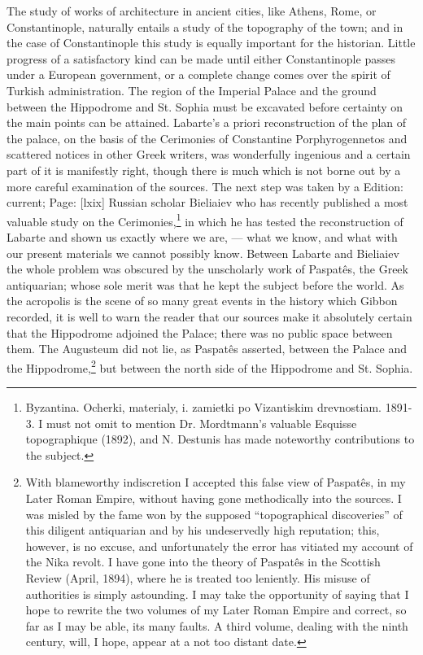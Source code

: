 The study of works of architecture in ancient cities, like Athens, Rome, or Constantinople, naturally entails a study of the topography of the town; and in the case of Constantinople this study is equally important for the historian. Little progress of a satisfactory kind can be made until either Constantinople passes under a European government, or a complete change comes over the spirit of Turkish administration. The region of the Imperial Palace and the ground between the Hippodrome and St. Sophia must be excavated before certainty on the main points can be attained. Labarte\texthebrew{}’s a priori reconstruction of the plan of the palace, on the basis of the Cerimonies of Constantine Porphyrogennetos and scattered notices in other Greek writers, was wonderfully ingenious and a certain part of it is manifestly right, though there is much which is not borne out by a more careful examination of the sources. The next step was taken by a Edition: current; Page: [lxix] Russian scholar Bieliaiev who has recently published a most valuable study on the Cerimonies,\footnote{Byzantina. Ocherki, materialy, i. zamietki po Vizantiskim drevnostiam. 1891-3. I must not omit to mention Dr. Mordtmann\texthebrew{}’s valuable Esquisse topographique (1892), and N. Destunis has made noteworthy contributions to the subject.} in which he has tested the reconstruction of Labarte and shown us exactly where we are, \texthebrew{—} what we know, and what with our present materials we cannot possibly know. Between Labarte and Bieliaiev the whole problem was obscured by the unscholarly work of Paspatês, the Greek antiquarian; whose sole merit was that he kept the subject before the world. As the acropolis is the scene of so many great events in the history which Gibbon recorded, it is well to warn the reader that our sources make it absolutely certain that the Hippodrome adjoined the Palace; there was no public space between them. The Augusteum did not lie, as Paspatês asserted, between the Palace and the Hippodrome,\footnote{With blameworthy indiscretion I accepted this false view of Paspatês, in my Later Roman Empire, without having gone methodically into the sources. I was misled by the fame won by the supposed \texthebrew{“}topographical discoveries\texthebrew{}” of this diligent antiquarian and by his undeservedly high reputation; this, however, is no excuse, and unfortunately the error has vitiated my account of the Nika revolt. I have gone into the theory of Paspatês in the Scottish Review (April, 1894), where he is treated too leniently. His misuse of authorities is simply astounding. I may take the opportunity of saying that I hope to rewrite the two volumes of my Later Roman Empire and correct, so far as I may be able, its many faults. A third volume, dealing with the ninth century, will, I hope, appear at a not too distant date.} but between the north side of the Hippodrome and St. Sophia.


